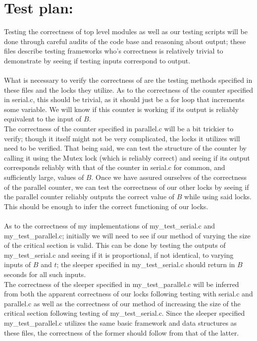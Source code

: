 \documentclass[]{article}
\begin{document}
\section{Test plan:} 
Testing the correctness of top level modules as well as our testing scripts will be done through careful audits of the code base and reasoning about output; these files describe testing frameworks who's correctness is relatively trivial to demonstrate by seeing if testing inputs correspond to output.
\\\\
What is necessary to verify the correctness of are the testing methods specified in these files and the locks they utilize. As to the correctness of the counter specified in serial.c, this should be trivial, as it should just be a for loop that increments some variable. We will know if this counter is working if its output is reliably equivalent to the input of $B$.
\\
The correctness of the counter specified in parallel.c will be a bit trickier to verify; though it itself might not be very complicated, the locks it utilizes will need to be verified. That being said, we can test the structure of the counter by calling it using the Mutex lock (which is reliably correct) and seeing if its output corresponds reliably with that of the counter in serial.c for common, and sufficiently large, values of $B$. Once we have assured ourselves of the correctness of the parallel counter, we can test the correctness of our other locks by seeing if the parallel counter reliably outputs the correct value of $B$ while using said locks. This should be enough to infer the correct functioning of our locks.
\\\\
As to the correctness of my implementations of my\_test\_serial.c and my\_test\_parallel.c; initially we will need to see if our method of varying the size of the critical section is valid. This can be done by testing the outputs of my\_test\_serial.c and seeing if it is proportional, if not identical, to varying inputs of $B$ and $t$; the sleeper specified in my\_test\_serial.c should return in $B$ seconds for all such inputs. 
\\
The correctness of the sleeper specified in my\_test\_parallel.c will be inferred from both the apparent correctness of our locks following testing with serial.c and parallel.c as well as the correctness of our method of increasing the size of the critical section following testing of my\_test\_serial.c. Since the sleeper specified my\_test\_parallel.c utilizes the same basic framework and data structures as these files, the correctness of the former should follow from that of the latter.
\end{document}
